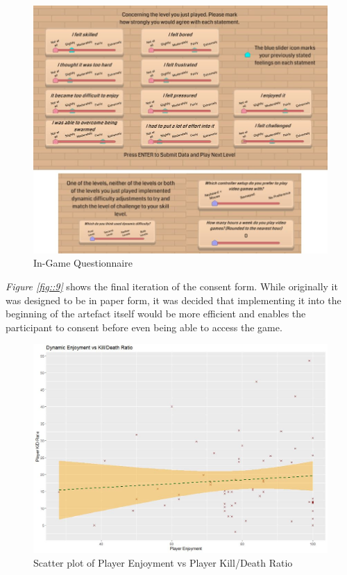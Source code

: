\documentclass[journal]{IEEEtran}
\begin{document}
\begin{figure}[h]
	\includegraphics[width=0.75\linewidth]{questionnaireingame.jpg}
	\caption{In-Game Questionnaire}
	\label{fig::10}
\end{figure} 



\textit{Figure \ref{fig::9}} shows the final iteration of the consent form. While originally it was designed to be in paper form, it was decided that implementing it into the beginning of the artefact itself would be more efficient and enables the participant to consent before even being able to access the game.

\begin{figure}[h]
	\includegraphics[width=0.75\linewidth]{dynamicfunKDR.jpg}
	\caption{Scatter plot of Player Enjoyment vs Player Kill/Death Ratio}
	\label{fig::11}
\end{figure} 
\end{document}
